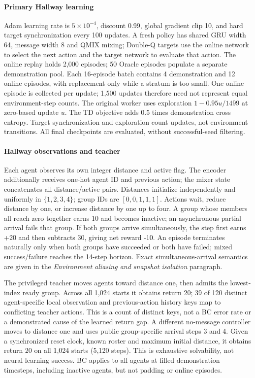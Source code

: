 \documentclass[11pt,a4paper]{article}
\begin{document}
\paragraph{Primary Hallway learning} Adam learning rate is $5\times10^{-4}$, discount 0.99, global gradient clip 10, and hard target synchronization every 100 updates. A fresh policy has shared GRU width 64, message width 8 and QMIX mixing; Double-Q targets use the online network to select the next action and the target network to evaluate that action. The online replay holds 2,000 episodes; 50 Oracle episodes populate a separate demonstration pool. Each 16-episode batch contains 4 demonstration and 12 online episodes, with replacement only while a stratum is too small. One online episode is collected per update; 1,500 updates therefore need not represent equal environment-step counts. The original worker uses exploration $1-0.95u/1499$ at zero-based update $u$. The TD objective adds 0.5 times demonstration cross entropy. Target synchronization and exploration count updates, not environment transitions. All final checkpoints are evaluated, without successful-seed filtering.

\paragraph{Hallway observations and teacher}\label{app:local_clock} Each agent observes its own integer distance and active flag. The encoder additionally receives one-hot agent ID and previous action; the mixer state concatenates all distance/active pairs. Distances initialize independently and uniformly in $\{1,2,3,4\}$; group IDs are $[0,0,1,1,1]$. Actions wait, reduce distance by one, or increase distance by one up to four. A group whose members all reach zero together earns 10 and becomes inactive; an asynchronous partial arrival fails that group. If both groups arrive simultaneously, the step first earns +20 and then subtracts 30, giving net reward -10. An episode terminates naturally only when both groups have succeeded or both have failed; mixed success/failure reaches the 14-step horizon. Exact simultaneous-arrival semantics are given in the \emph{Environment aliasing and snapshot isolation} paragraph.

The privileged teacher moves agents toward distance one, then admits the lowest-index ready group. Across all 1,024 starts it obtains return 20; 39 of 120 distinct agent-specific local observation and previous-action history keys map to conflicting teacher actions. This is a count of distinct keys, not a BC error rate or a demonstrated cause of the learned return gap. A different no-message controller moves to distance one and uses public group-specific arrival steps 3 and 4. Given a synchronized reset clock, known roster and maximum initial distance, it obtains return 20 on all 1,024 starts (5,120 steps). This is exhaustive solvability, not neural learning success. BC applies to all agents at filled demonstration timesteps, including inactive agents, but not padding or online episodes.
\end{document}
